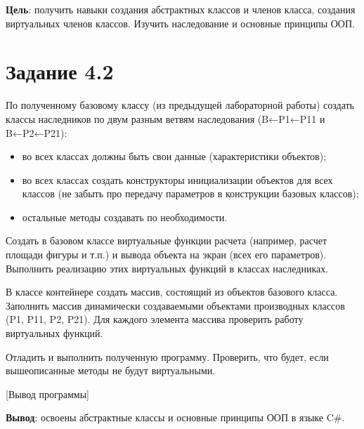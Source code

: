 \documentclass{bsuir}
\newcommand{\csharp}{C{\liberationrm\#}}
\begin{document}

    \textbf{Цель}: получить навыки создания абстрактных классов и членов класса,
    создания виртуальных членов классов. Изучить наследование и основные принципы
    ООП.

    \section*{Задание 4.2}

    По полученному базовому классу (из предыдущей лабораторной работы) создать
    классы наследников по двум разным ветвям наследования (B←P1←P11 и B←P2←P21):
    
    \begin{itemize}
        \item во всех классах должны быть свои данные (характеристики объектов);
        \item во всех классах создать конструкторы инициализации объектов для
              всех классов (не забыть про передачу параметров в конструкции
              базовых классов);
        \item остальные методы создавать по необходимости.
    \end{itemize}

    Создать в базовом классе виртуальные функции расчета (например, расчет
    площади фигуры и т.п.) и вывода объекта на экран (всех его параметров).
    Выполнить реализацию этих виртуальных функций в классах наследниках.
    
    В классе контейнере создать массив, состоящий из объектов базового класса.
    Заполнить массив динамически создаваемыми объектами производных классов (P1,
    P11, P2, P21). Для каждого элемента массива проверить работу виртуальных
    функций.
    
    Отладить и выполнить полученную программу. Проверить, что будет, если
    вышеописанные методы не будут виртуальными.


    [Вывод программы]

    \textbf{Вывод}: освоены абстрактные классы и основные принципы ООП в языке
    \csharp.
\end{document}
